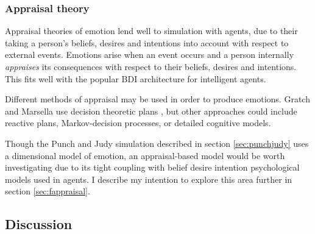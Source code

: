 \subsubsection{Appraisal theory}
Appraisal theories of emotion lend well to simulation with agents, due to their taking a person's beliefs, desires and intentions into account with respect to external events. Emotions arise when an event occurs and a person internally \emph{appraises} its consequences with respect to their beliefs, desires and intentions. This fits well with the popular BDI architecture for intelligent agents.

Different methods of appraisal may be used in order to produce emotions. Gratch and Marsella use decision theoretic plans \citep{gratch2004domain}, but other approaches could include reactive plans, Markov-decision processes, or detailed cognitive models.

Though the Punch and Judy simulation described in section \ref{sec:punchjudy} uses a dimensional model of emotion, an appraisal-based model would be worth investigating due to its tight coupling with belief desire intention psychological models used in agents. I describe my intention to explore this area further in section \ref{sec:fappraisal}.

\subsection{Discussion}
